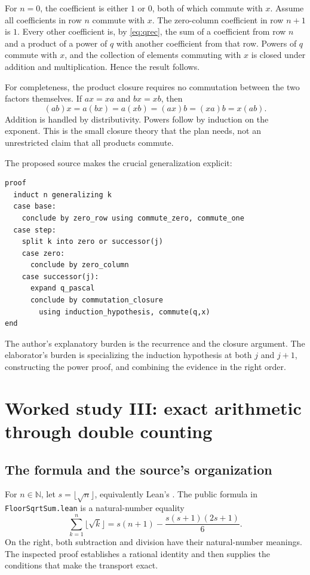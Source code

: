 \documentclass[11pt,a4paper]{article}
\newcommand{\code}[1]{\nolinkurl{#1}}
\newcommand{\N}{\mathbb N}
\theoremstyle{definition}
\theoremstyle{remark}
\numberwithin{equation}{section}
\begin{document}
For $n=0$, the coefficient is either $1$ or $0$, both of which commute with $x$. Assume all coefficients in row $n$ commute with $x$. The zero-column coefficient in row $n+1$ is $1$. Every other coefficient is, by \cref{eq:qrec}, the sum of a coefficient from row $n$ and a product of a power of $q$ with another coefficient from that row. Powers of $q$ commute with $x$, and the collection of elements commuting with $x$ is closed under addition and multiplication. Hence the result follows.

For completeness, the product closure requires no commutation between the two factors themselves. If $ax=xa$ and $bx=xb$, then
\[
 (ab)x=a(bx)=a(xb)=(ax)b=(xa)b=x(ab).
\]
Addition is handled by distributivity. Powers follow by induction on the exponent. This is the small closure theory that the plan needs, not an unrestricted claim that all products commute.

The proposed source makes the crucial generalization explicit:
\begin{lstlisting}
proof
  induct n generalizing k
  case base:
    conclude by zero_row using commute_zero, commute_one
  case step:
    split k into zero or successor(j)
    case zero:
      conclude by zero_column
    case successor(j):
      expand q_pascal
      conclude by commutation_closure
        using induction_hypothesis, commute(q,x)
end
\end{lstlisting}
The author's explanatory burden is the recurrence and the closure argument. The elaborator's burden is specializing the induction hypothesis at both $j$ and $j+1$, constructing the power proof, and combining the evidence in the right order.

\section{Worked study III: exact arithmetic through double counting}
\label{sec:floor}
\subsection{The formula and the source's organization}
For $n\in\N$, let $s=\lfloor\sqrt n\rfloor$, equivalently Lean's \texttt{}. The public formula in \code{FloorSqrtSum.lean} is a natural-number equality
\begin{equation}\label{eq:floorformula}
 \sum_{k=1}^{n}\lfloor\sqrt k\rfloor
 =s(n+1)-\frac{s(s+1)(2s+1)}6.
\end{equation}
On the right, both subtraction and division have their natural-number meanings. The inspected proof establishes a rational identity and then supplies the conditions that make the transport exact.\cite{p-floor}
\end{document}
